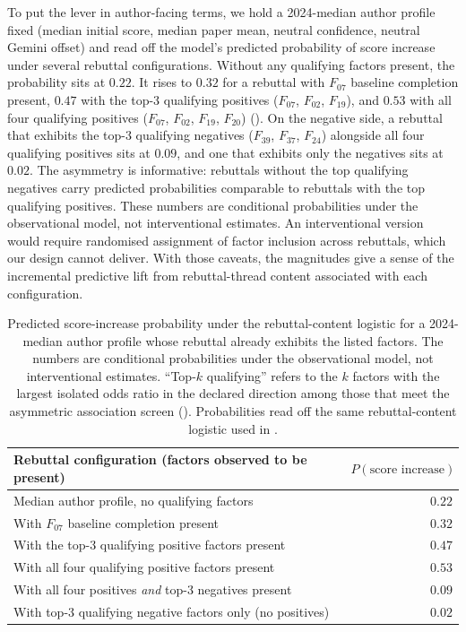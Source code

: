 \documentclass{article}
\begin{document}
To put the lever in author-facing terms, we hold a 2024-median author profile fixed (median initial score, median paper mean, neutral confidence, neutral Gemini offset) and read off the model's predicted probability of score increase under several rebuttal configurations. Without any qualifying factors present, the probability sits at $0.22$. It rises to $0.32$ for a rebuttal with $F_{07}$ baseline completion present, $0.47$ with the top-3 qualifying positives ($F_{07}$, $F_{02}$, $F_{19}$), and $0.53$ with all four qualifying positives ($F_{07}$, $F_{02}$, $F_{19}$, $F_{20}$) (). On the negative side, a rebuttal that exhibits the top-3 qualifying negatives ($F_{39}$, $F_{37}$, $F_{24}$) alongside all four qualifying positives sits at $0.09$, and one that exhibits only the negatives sits at $0.02$. The asymmetry is informative: rebuttals without the top qualifying negatives carry predicted probabilities comparable to rebuttals with the top qualifying positives. These numbers are conditional probabilities under the observational model, not interventional estimates. An interventional version would require randomised assignment of factor inclusion across rebuttals, which our design cannot deliver. With those caveats, the magnitudes give a sense of the incremental predictive lift from rebuttal-thread content associated with each configuration.

\begin{table}[!htbp]
  \centering
  \caption{Predicted score-increase probability under the rebuttal-content logistic for a 2024-median author profile whose rebuttal already exhibits the listed factors. The numbers are conditional probabilities under the observational model, not interventional estimates. ``Top-$k$ qualifying'' refers to the $k$ factors with the largest isolated odds ratio in the declared direction among those that meet the asymmetric association screen (). Probabilities read off the same rebuttal-content logistic used in .}
  \label{tab:scenarios}
  \small
  \begin{tabular}{lr}
    \toprule
    Rebuttal configuration (factors observed to be present) & $P(\text{score increase})$ \\
    \midrule
    Median author profile, no qualifying factors                                       & $0.22$ \\
    With $F_{07}$ baseline completion present                                          & $0.32$ \\
    With the top-3 qualifying positive factors present                                 & $0.47$ \\
    With all four qualifying positive factors present                                  & $0.53$ \\
    With all four positives \emph{and} top-3 negatives present                         & $0.09$ \\
    With top-3 qualifying negative factors only (no positives)                         & $0.02$ \\
    \bottomrule
  \end{tabular}
\end{table}
\end{document}

